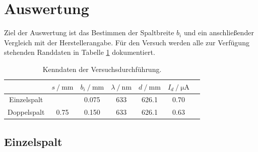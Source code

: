 \section{Auswertung}
\label{sec:Auswertung}
Ziel der Auswertung ist das Bestimmen der Spaltbreite $b_i$ und ein anschließender Vergleich mit der Herstellerangabe.
Für den Versuch werden alle zur Verfügung stehenden Randdaten in Tabelle \ref{tab:rand} dokumentiert.

\begin{table}
    \centering
    \caption{Kenndaten der Versuchsdurchführung.}
    \label{tab:rand}
    \begin{tabular}{c c c c c c c}
        \toprule
        & $s\:/\:\si{\milli\meter}$ & $b_i\:/\:\si{\milli\meter}$ & $\lambda\:/\:\si{\nano\meter}$ & $d\:/\:\si{\milli\meter}$ & $I_d\:/\:\si{\micro\ampere}$ \\
        \midrule
        Einzelspalt &      & 0.075 & 633 & 626.1 & 0.70 \\
        Doppelspalt & 0.75 & 0.150 & 633 & 626.1 & 0.63 \\
        \bottomrule
    \end{tabular}
\end{table}

\subsection{Einzelspalt}

